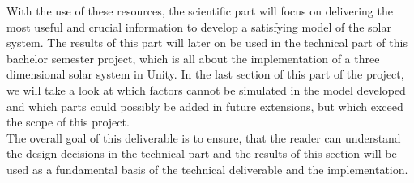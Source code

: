 \documentclass[conference,compsoc]{IEEEtran}
\begin{document}
With the use of these resources, the scientific part will focus on delivering the most useful and crucial information to develop a satisfying model of the solar system. The results of this part will later on be used in the technical part of this bachelor semester project, which is all about the implementation of a three dimensional solar system in Unity. In the last section of this part of the project, we will take a look at which factors cannot be simulated in the model developed and which parts could possibly be added in future extensions, but which exceed the scope of this project. \\
The overall goal of this deliverable is to ensure, that the reader can understand the design decisions in the technical part and the results of this section will be used as a fundamental basis of the technical deliverable and the implementation.

\end{document}
